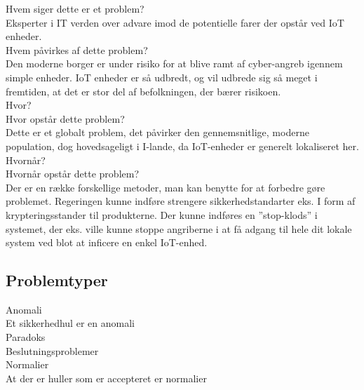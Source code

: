         
        Hvem siger dette er et problem?\\
        Eksperter i IT verden over advare imod de potentielle farer der opstår ved IoT enheder.\autocite{Rainie2017}\\
        Hvem påvirkes af dette problem?\\
        Den moderne borger er under risiko for at blive ramt af cyber-angreb igennem simple enheder. IoT enheder er så udbredt, og vil udbrede sig så meget i fremtiden, at det er stor del af befolkningen, der bærer risikoen.\\
        
        Hvor?\\
        Hvor opstår dette problem?\\
        Dette er et globalt problem, det påvirker den gennemsnitlige, moderne population, dog hovedsageligt i I-lande, da IoT-enheder er generelt lokaliseret her.\\
        
        Hvornår?\\
        Hvornår opstår dette problem?\\
        Der er en række forskellige metoder, man kan benytte for at forbedre gøre problemet. Regeringen kunne indføre strengere sikkerhedstandarter eks. I form af krypteringsstander til produkterne. Der kunne indføres en ”stop-klods” i systemet, der eks. ville kunne stoppe angriberne i at få adgang til hele dit lokale system ved blot at inficere en enkel IoT-enhed.\\
        
    
    \subsection{Problemtyper}
    Anomali\\
    Et sikkerhedhul er en anomali\\
    Paradoks\\
    Beslutningsproblemer\\
    Normalier\\
    At der er huller som er accepteret er normalier\\
